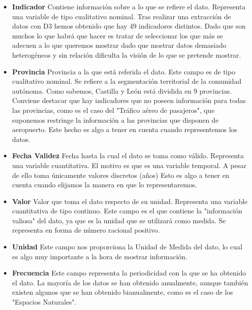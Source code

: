 \documentclass{article}
\begin{document}
			\begin{itemize}
			
				\item {\bf Indicador } Contiene información sobre a lo que se refiere el dato. Representa una variable de tipo cualitativo nominal. Tras realizar una extracción de datos con D3 hemos obtenido que hay 49 indicadores distintos. Dado que son muchos lo que habrá que hacer es tratar de seleccionar los que más se adecuen a lo que queremos mostrar dado que mostrar datos demasiado heterogéneos y sin relación dificulta la visión de lo que se pretende mostrar.
				
				\item {\bf Provincia } Provincia a la que está referida el dato. Este campo es de tipo cualitativo nominal. Se refiere a la segmentación territorial de la comunidad autónoma. Como sabemos, Castilla y León está dividida en 9 provincias. Conviene destacar que hay indicadores que no poseen información para todas las provincias, como es el caso del "Tráfico aéreo de pasajeros", que suponemos restringe la información a las provincias que disponen de aeropuerto. Este hecho es algo a tener en cuenta cuando representemos los datos.

				\item {\bf Fecha Validez } Fecha hasta la cual el dato se toma como válido. Representa una variable cuantitativa. El motivo es que es una variable temporal. A pesar de ello toma únicamente valores discretos (años) Esto es algo a tener en cuenta cuando elijamos la manera en que lo representaremos.

				\item {\bf Valor } Valor que toma el dato respecto de su unidad.  Representa una variable cuantitativa de tipo continuo. Este campo es el que contiene la "información valiosa" del dato, ya que es la unidad que se utilizará como medida. Se representa en forma de número racional positivo.

				\item {\bf Unidad } Este campo nos proporciona la Unidad de Medida del dato, lo cual es algo muy importante a la hora de mostrar información.

				\item {\bf Frecuencia } Este campo representa la periodicidad con la que se ha obtenido el dato. La mayoría de los datos se han obtenido anualmente, aunque también existen algunos que se han obtenido bianualmente, como es el caso de los "Espacios Naturales".
			
			\end{itemize}
			
\end{document}
